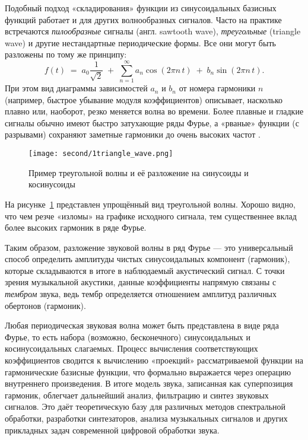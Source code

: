 \documentclass[bachelor, och, diploma]{SCWorks}
\begin{document}
Подобный подход «складирования» функции из синусоидальных базисных функций работает и для других волнообразных сигналов. Часто на практике встречаются \textit{пилообразные} сигналы (англ. sawtooth wave), \textit{треугольные} (triangle wave) и другие нестандартные периодические формы. Все они могут быть разложены по тому же принципу:
\[
f(t) \;=\; 
a_0 \frac{1}{\sqrt{2}} 
\;+\;
\sum_{n=1}^{\infty} 
a_n \cos(2\pi n\,t) \;+\; 
b_n \sin(2\pi n\,t).
\]
При этом вид диаграммы зависимостей \(a_n\) и \(b_n\) от номера гармоники \(n\) (например, быстрое убывание модуля коэффициентов) описывает, насколько плавно или, наоборот, резко меняется волна во времени. Более плавные и гладкие сигналы обычно имеют быстро затухающие ряды Фурье, а «рваные» функции (с разрывами) сохраняют заметные гармоники до очень высоких частот \cite{downey}.

\begin{figure}[h!]
  \centering
  \texttt{[image: second/1triangle\_wave.png]}
  \caption{Пример треугольной волны и её разложение на синусоиды и косинусоиды}
  \label{fig:triangle_wave_example}
\end{figure}

На рисунке~\ref{fig:triangle_wave_example} представлен упрощённый вид треугольной волны. Хорошо видно, что чем резче «изломы» на графике исходного сигнала, тем существеннее вклад более высоких гармоник в ряде Фурье. 

Таким образом, разложение звуковой волны в ряд Фурье — это универсальный способ определить амплитуды чистых синусоидальных компонент (гармоник), которые складываются в итоге в наблюдаемый акустический сигнал. С точки зрения музыкальной акустики, данные коэффициенты напрямую связаны с \textit{тембром} звука, ведь тембр определяется отношением амплитуд различных обертонов (гармоник).

Любая периодическая звуковая волна может быть представлена в виде ряда Фурье, то есть набора (возможно, бесконечного) синусоидальных и косинусоидальных слагаемых. Процесс вычисления соответствующих коэффициентов сводится к вычислению «проекций» рассматриваемой функции на гармонические базисные функции, что формально выражается через операцию внутреннего произведения. В итоге модель звука, записанная как суперпозиция гармоник, облегчает дальнейший анализ, фильтрацию и синтез звуковых сигналов. Это даёт теоретическую базу для различных методов спектральной обработки, разработки синтезаторов, анализа музыкальных сигналов и других прикладных задач современной цифровой обработки звука.
\end{document}
